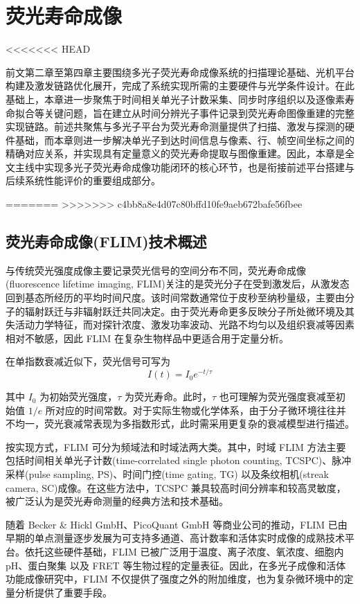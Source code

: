 \chapter{荧光寿命成像}\label{Chap:5}
<<<<<<< HEAD

前文第二章至第四章主要围绕多光子荧光寿命成像系统的扫描理论基础、光机平台构建及激发链路优化展开，完成了系统实现所需的主要硬件与光学条件设计。在此基础上，本章进一步聚焦于时间相关单光子计数采集、同步时序组织以及逐像素寿命拟合等关键问题，旨在建立从时间分辨光子事件记录到荧光寿命图像重建的完整实现链路。前述共聚焦与多光子平台为荧光寿命测量提供了扫描、激发与探测的硬件基础，而本章则进一步解决单光子到达时间信息与像素、行、帧空间坐标之间的精确对应关系，并实现具有定量意义的荧光寿命提取与图像重建。因此，本章是全文主线中实现多光子荧光寿命成像功能闭环的核心环节，也是衔接前述平台搭建与后续系统性能评价的重要组成部分。

=======
>>>>>>> c4bb8a8e4d07c80bffd10fe9aeb672bafe56fbee
\section{荧光寿命成像(FLIM)技术概述}\label{5.1}

与传统荧光强度成像主要记录荧光信号的空间分布不同，荧光寿命成像(fluorescence lifetime imaging, FLIM)关注的是荧光分子在受到激发后，从激发态回到基态所经历的平均时间尺度。该时间常数通常位于皮秒至纳秒量级，主要由分子的辐射跃迁与非辐射跃迁共同决定。由于荧光寿命更多反映分子所处微环境及其失活动力学特征，而对探针浓度、激发功率波动、光路不均匀以及组织衰减等因素相对不敏感，因此 FLIM 在复杂生物样品中更适合用于定量分析\cite{RN563}。

在单指数衰减近似下，荧光信号可写为
\begin{equation}
  I(t)=I_0 e^{-t/\tau}
\end{equation}

其中 $I_0$ 为初始荧光强度，$\tau$ 为荧光寿命。此时，$\tau$ 也可理解为荧光强度衰减至初始值 $1/e$ 所对应的时间常数。对于实际生物或化学体系，由于分子微环境往往并不均一，荧光衰减常表现为多指数形式，此时需采用更复杂的衰减模型进行描述\cite{RN2036}。

按实现方式，FLIM 可分为频域法和时域法两大类\cite{RN1623}。其中，时域 FLIM 方法主要包括时间相关单光子计数(time-correlated single photon counting, TCSPC)、脉冲采样(pulse sampling, PS)\cite{RN2118}、时间门控(time gating, TG)\cite{RN2120} 以及条纹相机(streak camera, SC)成像\cite{RN568,RN2075}。在这些方法中，TCSPC 兼具较高时间分辨率和较高灵敏度，被广泛认为是荧光寿命测量的经典方法和技术基础。

随着 Becker \& Hickl GmbH、PicoQuant GmbH 等商业公司的推动，FLIM 已由早期的单点测量逐步发展为可支持多通道、高计数率和活体实时成像的成熟技术平台\cite{RN1656,RN897,RN2050,RN2049}。依托这些硬件基础，FLIM 已被广泛用于温度\cite{RN2037,RN127}、离子浓度\cite{RN2038}、氧浓度\cite{RN2040}、细胞内 pH\cite{RN2042}、蛋白聚集\cite{RN2041} 以及 FRET \cite{RN913,RN1809,RN247} 等生物过程的定量表征。因此，在多光子成像和活体功能成像研究中，FLIM 不仅提供了强度之外的附加维度，也为复杂微环境中的定量分析提供了重要手段。



